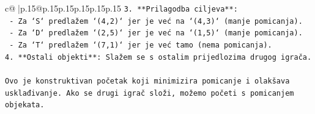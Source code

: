 \documentclass{article}
\begin{document}
{\begin{supertabular}{c@{$\;$}|p{.15\linewidth}@{}p{.15\linewidth}p{.15\linewidth}p{.15\linewidth}p{.15\linewidth}p{.15\linewidth}}
{{{\texttt{3. **Prilagodba ciljeva**:} \\
\texttt{   {-} Za `S` predlažem `(4,2)` jer je već na `(4,3)` (manje pomicanja).} \\
\texttt{   {-} Za `D` predlažem `(2,5)` jer je već na `(1,5)` (manje pomicanja).} \\
\texttt{   {-} Za `T` predlažem `(7,1)` jer je već tamo (nema pomicanja).} \\
\texttt{4. **Ostali objekti**: Slažem se s ostalim prijedlozima drugog igrača.} \\
\\ 
\texttt{Ovo je konstruktivan početak koji minimizira pomicanje i olakšava usklađivanje. Ako se drugi igrač složi, možemo početi s pomicanjem objekata.} \\
            }
        }
    }
     \\ \\


\end{supertabular}}
\end{document}
